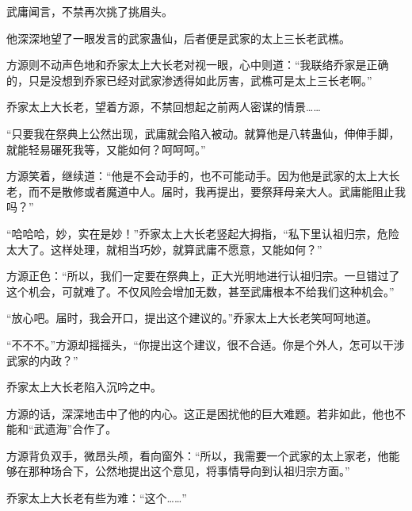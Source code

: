 \begin{this_body}
武庸闻言，不禁再次挑了挑眉头。

他深深地望了一眼发言的武家蛊仙，后者便是武家的太上三长老武樵。

方源则不动声色地和乔家太上大长老对视一眼，心中则道：“我联络乔家是正确的，只是没想到乔家已经对武家渗透得如此厉害，武樵可是太上三长老啊。”

乔家太上大长老，望着方源，不禁回想起之前两人密谋的情景……

“只要我在祭典上公然出现，武庸就会陷入被动。就算他是八转蛊仙，伸伸手脚，就能轻易碾死我等，又能如何？呵呵呵。”

方源笑着，继续道：“他是不会动手的，也不可能动手。因为他是武家的太上大长老，而不是散修或者魔道中人。届时，我再提出，要祭拜母亲大人。武庸能阻止我吗？”

“哈哈哈，妙，实在是妙！”乔家太上大长老竖起大拇指，“私下里认祖归宗，危险太大了。这样处理，就相当巧妙，就算武庸不愿意，又能如何？”

方源正色：“所以，我们一定要在祭典上，正大光明地进行认祖归宗。一旦错过了这个机会，可就难了。不仅风险会增加无数，甚至武庸根本不给我们这种机会。”

“放心吧。届时，我会开口，提出这个建议的。”乔家太上大长老笑呵呵地道。

“不不不。”方源却摇摇头，“你提出这个建议，很不合适。你是个外人，怎可以干涉武家的内政？”

乔家太上大长老陷入沉吟之中。

方源的话，深深地击中了他的内心。这正是困扰他的巨大难题。若非如此，他也不能和“武遗海”合作了。

方源背负双手，微昂头颅，看向窗外：“所以，我需要一个武家的太上家老，他能够在那种场合下，公然地提出这个意见，将事情导向到认祖归宗方面。”

乔家太上大长老有些为难：“这个……”

\end{this_body}

